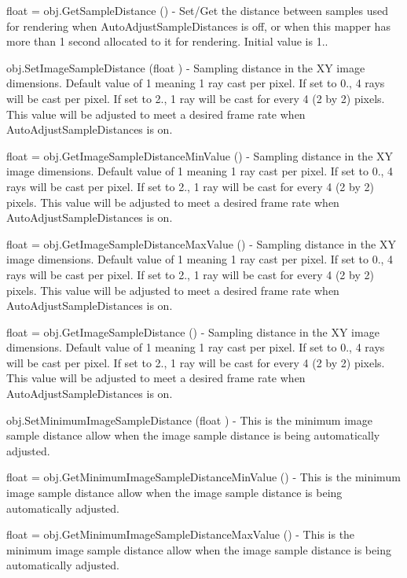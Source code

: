 \begin{DoxyItemize}
\item {\ttfamily float = obj.\-Get\-Sample\-Distance ()} -\/ Set/\-Get the distance between samples used for rendering when Auto\-Adjust\-Sample\-Distances is off, or when this mapper has more than 1 second allocated to it for rendering. Initial value is 1..  
\item {\ttfamily obj.\-Set\-Image\-Sample\-Distance (float )} -\/ Sampling distance in the X\-Y image dimensions. Default value of 1 meaning 1 ray cast per pixel. If set to 0., 4 rays will be cast per pixel. If set to 2., 1 ray will be cast for every 4 (2 by 2) pixels. This value will be adjusted to meet a desired frame rate when Auto\-Adjust\-Sample\-Distances is on.  
\item {\ttfamily float = obj.\-Get\-Image\-Sample\-Distance\-Min\-Value ()} -\/ Sampling distance in the X\-Y image dimensions. Default value of 1 meaning 1 ray cast per pixel. If set to 0., 4 rays will be cast per pixel. If set to 2., 1 ray will be cast for every 4 (2 by 2) pixels. This value will be adjusted to meet a desired frame rate when Auto\-Adjust\-Sample\-Distances is on.  
\item {\ttfamily float = obj.\-Get\-Image\-Sample\-Distance\-Max\-Value ()} -\/ Sampling distance in the X\-Y image dimensions. Default value of 1 meaning 1 ray cast per pixel. If set to 0., 4 rays will be cast per pixel. If set to 2., 1 ray will be cast for every 4 (2 by 2) pixels. This value will be adjusted to meet a desired frame rate when Auto\-Adjust\-Sample\-Distances is on.  
\item {\ttfamily float = obj.\-Get\-Image\-Sample\-Distance ()} -\/ Sampling distance in the X\-Y image dimensions. Default value of 1 meaning 1 ray cast per pixel. If set to 0., 4 rays will be cast per pixel. If set to 2., 1 ray will be cast for every 4 (2 by 2) pixels. This value will be adjusted to meet a desired frame rate when Auto\-Adjust\-Sample\-Distances is on.  
\item {\ttfamily obj.\-Set\-Minimum\-Image\-Sample\-Distance (float )} -\/ This is the minimum image sample distance allow when the image sample distance is being automatically adjusted.  
\item {\ttfamily float = obj.\-Get\-Minimum\-Image\-Sample\-Distance\-Min\-Value ()} -\/ This is the minimum image sample distance allow when the image sample distance is being automatically adjusted.  
\item {\ttfamily float = obj.\-Get\-Minimum\-Image\-Sample\-Distance\-Max\-Value ()} -\/ This is the minimum image sample distance allow when the image sample distance is being automatically adjusted.  

\end{DoxyItemize}
